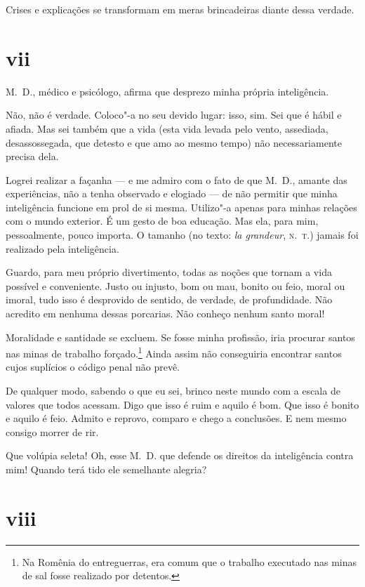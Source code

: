 Crises e explicações se transformam em meras brincadeiras diante dessa
verdade.

\section{vii}


M.~D., médico e psicólogo, afirma que desprezo minha própria
inteligência.

Não, não é verdade. Coloco"-a no seu devido lugar: isso, sim. Sei que é
hábil e afiada. Mas sei também que a vida (esta vida levada pelo vento,
assediada, desassossegada, que detesto e que amo ao mesmo
tempo) não necessariamente precisa dela.

Logrei realizar a façanha --- e me admiro com o fato de que M.~D., amante
das experiências, não a tenha observado e elogiado --- de não permitir que
minha inteligência funcione em prol de si mesma. Utilizo"-a apenas para
minhas relações com o mundo exterior. É um gesto de boa educação. Mas
ela, para mim, pessoalmente, pouco importa. O tamanho (no texto: \emph{la
grandeur}, \textsc{n.~t.}) jamais foi realizado pela inteligência.

Guardo, para meu próprio divertimento, todas as noções que tornam a vida
possível e conveniente. Justo ou injusto, bom ou mau, bonito ou feio,
moral ou imoral, tudo isso é desprovido de sentido, de verdade, de
profundidade. Não acredito em nenhuma dessas porcarias. Não
conheço nenhum santo moral!

Moralidade e santidade se excluem. Se fosse minha profissão,
iria procurar santos nas minas de trabalho
forçado.\footnote{Na Romênia do entreguerras, era comum que o trabalho executado nas minas de sal fosse realizado por detentos.} Ainda
assim não conseguiria encontrar santos cujos suplícios o código
penal não prevê.

De qualquer modo, sabendo o que eu sei, brinco neste mundo com a escala
de valores que todos acessam. Digo que isso é ruim e aquilo é bom. Que
isso é bonito e aquilo é feio. Admito e reprovo, comparo e chego a
conclusões. E nem mesmo consigo morrer de rir.

Que volúpia seleta! Oh, esse M.~D. que defende os direitos da
inteligência contra mim! Quando terá tido ele semelhante alegria?

\section{viii}

